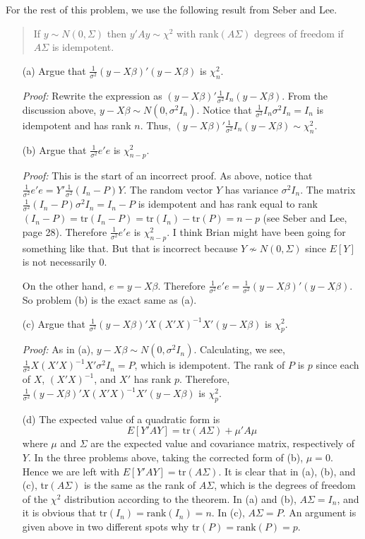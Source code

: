 \documentclass[letterpaper,10pt]{article}
\begin{document}
\begin{enumerate}
For the rest of this problem, we use the following result from Seber and Lee.
\begin{quote}
If $y \sim N(0, \Sigma)$ then $y'Ay \sim \chi ^2$ with rank$(A \Sigma)$ degrees of freedom if $A \Sigma$ is idempotent.
\end{quote}
\begin{enumerate}
\item[(a)]
Argue that $\frac{1}{\sigma^2}(y - X \beta)'(y - X \beta)$ is $\chi_n^2$.

\textit{Proof:}
Rewrite the expression as $(y - X \beta)'\frac{1}{\sigma^2}I_n(y - X \beta)$. 
From the discussion above, $y - X \beta \sim N(0, \sigma^2 I_n)$. 
Notice that $\frac{1}{\sigma^2}I_n \sigma^2 I_n =I_n$ is idempotent and has rank $n$. Thus, $(y - X \beta)'\frac{1}{\sigma^2}I_n(y - X \beta) \sim \chi^2_n$.
\item[(b)]
Argue that $\frac{1}{\sigma^2}e' e$ is $\chi^2_{n-p}$.

\textit{Proof:}
This is the start of an incorrect proof. As above, notice that $\frac{1}{\sigma^2}e' e = Y' \frac{1}{\sigma^2}(I_n - P) Y$. The random vector $Y$ has variance $\sigma^2 I_n$. 
The matrix $\frac{1}{\sigma^2}(I_n - P)\sigma^2 I_n = I_n - P$ is idempotent and has rank equal to rank$(I_n -P) = \text{tr}(I_n - P) = \text{tr}(I_n) - \text{tr}(P) =n-p$ (see Seber and Lee, page 28). 
Therefore $\frac{1}{\sigma^2}e' e$ is $\chi^2_{n-p}$. I think Brian might have been going for something like that. But that is incorrect because $Y \nsim N(0, \Sigma)$ since $E[Y]$ is not necessarily $0$. 

On the other hand, $e = y - X\beta$. 
Therefore $\frac{1}{\sigma^2}e' e = \frac{1}{\sigma^2}(y - X \beta)'(y - X \beta)$. 
So problem (b) is the exact same as (a).
\item[(c)]
Argue that $\frac{1}{\sigma^2}(y - X \beta)'X(X'X)^{-1}X'(y - X \beta)$ is $\chi^2_p$.

\textit{Proof:}
As in (a), $y - X \beta \sim N(0, \sigma^2 I_n)$. Calculating, we see, $\frac{1}{\sigma^2}X(X'X)^{-1}X'\sigma^2 I_n = P$, which is idempotent. The rank of $P$ is $p$ since each of $X$, $(X'X)^{-1}$, and $X'$ has rank $p$. Therefore, $\frac{1}{\sigma^2}(y - X \beta)'X(X'X)^{-1}X'(y - X \beta)$ is $\chi^2_p$.

\item[(d)]
The expected value of a quadratic form is 
\[
E[Y'AY] = \text{tr}(A \Sigma) + \mu'A\mu
\]
where $\mu$ and $\Sigma$ are the expected value and covariance matrix, respectively of $Y$. In the three problems above, taking the corrected form of (b), $\mu = 0$. 
Hence we are left with $E[Y'AY] = \text{tr}(A \Sigma)$. 
It is clear that in (a), (b), and (c), tr$(A \Sigma)$ is the same as the rank of $A \Sigma$, which is the degrees of freedom of the $\chi^2$ distribution according to the theorem. 
In (a) and (b), $A \Sigma = I_n$, and it is obvious that $\text{tr}(I_n) = \text{rank}(I_n) = n$. In (c), $A \Sigma = P$. An argument is given above in two different spots why tr$(P) = \text{rank}(P) = p$.
\end{enumerate}
\end{enumerate}
\end{document}
